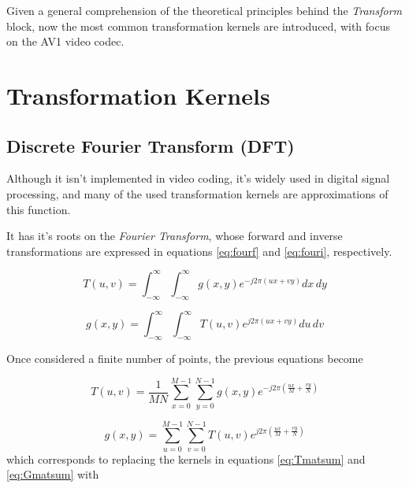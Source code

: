 
Given a general comprehension of the theoretical principles behind the \emph{Transform} block, now the most common transformation kernels are introduced, with focus on the AV1 video codec.

\section{Transformation Kernels} \label{sec:kernels}

\subsection{Discrete Fourier Transform (DFT)}

Although it isn't implemented in video coding, it's widely used in digital signal processing, and many of the used transformation kernels are approximations of this function.

It has it's roots on the \emph{Fourier Transform}, whose forward and inverse transformations are expressed in equations \ref{eq:fourf} and \ref{eq:fouri}, respectively.

\begin{equation} \label{eq:fourf}
    T(u,v) = \int_{-\infty}^{\infty}\int_{-\infty}^{\infty}g(x,y)e^{-j2\pi(ux+vy)} dx \, dy
\end{equation}

\begin{equation} \label{eq:fouri}
    g(x,y) = \int_{-\infty}^{\infty}\int_{-\infty}^{\infty}T(u,v)e^{j2\pi(ux+vy)} du \, dv
\end{equation}

Once considered a finite number of points, the previous equations become

\begin{equation} \label{eq:dftf}
    T(u,v) = \frac{1}{MN}\sum_{x=0}^{M-1}\sum_{y=0}^{N-1}g(x,y)e^{-j2\pi \left(\frac{ux}{M}+\frac{vy}{N}\right)}
\end{equation}

\begin{equation} \label{eq:dfti}
    g(x,y) = \sum_{u=0}^{M-1}\sum_{v=0}^{N-1}T(u,v)e^{j2\pi \left(\frac{ux}{M}+\frac{vy}{N}\right)}
\end{equation}
which corresponds to replacing the kernels in equations \ref{eq:Tmatsum} and \ref{eq:Gmatsum} with

